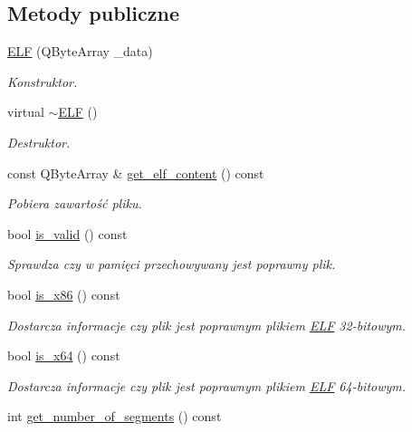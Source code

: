 \subsection*{Metody publiczne}
\begin{DoxyCompactItemize}
\item 
\hyperlink{class_e_l_f_a7bcefdc63dcaee056a3800f57cf73992}{E\-L\-F} (Q\-Byte\-Array \-\_\-data)
\begin{DoxyCompactList}\small\item\em Konstruktor. \end{DoxyCompactList}\item 
virtual \hyperlink{class_e_l_f_a8d420911533a8753e9936cb5c9238747}{$\sim$\-E\-L\-F} ()
\begin{DoxyCompactList}\small\item\em Destruktor. \end{DoxyCompactList}\item 
const Q\-Byte\-Array \& \hyperlink{class_e_l_f_ad2f8a0a47d56ee33a9234c9415414e00}{get\-\_\-elf\-\_\-content} () const 
\begin{DoxyCompactList}\small\item\em Pobiera zawartość pliku. \end{DoxyCompactList}\item 
bool \hyperlink{class_e_l_f_aaf0da9f62b61fc3674b7fd54d9885b5f}{is\-\_\-valid} () const 
\begin{DoxyCompactList}\small\item\em Sprawdza czy w pamięci przechowywany jest poprawny plik. \end{DoxyCompactList}\item 
bool \hyperlink{class_e_l_f_ac5c89b2b437f3e07aedc06f66cdab94d}{is\-\_\-x86} () const 
\begin{DoxyCompactList}\small\item\em Dostarcza informacje czy plik jest poprawnym plikiem \hyperlink{class_e_l_f}{E\-L\-F} 32-\/bitowym. \end{DoxyCompactList}\item 
bool \hyperlink{class_e_l_f_a558b2f169db21b21b24d6ff19c38ac9e}{is\-\_\-x64} () const 
\begin{DoxyCompactList}\small\item\em Dostarcza informacje czy plik jest poprawnym plikiem \hyperlink{class_e_l_f}{E\-L\-F} 64-\/bitowym. \end{DoxyCompactList}\item 
int \hyperlink{class_e_l_f_a8b65b7ea1b57aa25d3171a25528a43f8}{get\-\_\-number\-\_\-of\-\_\-segments} () const 

\end{DoxyCompactItemize}
